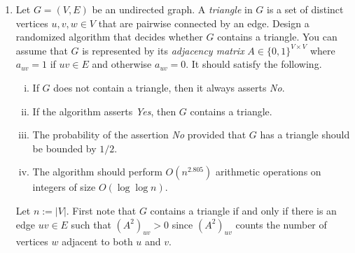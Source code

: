 \documentclass[11pt]{article}
\begin{document}
\begin{enumerate}[1)]
\begin{solution}
\begin{enumerate}[i)]
\item For $k=1$ the claim is trivial. Suppose that the claim holds for some $k>1$. We will show that it holds for $k+1$. One has
\[
(A^{k+1})_{uv}=(A^kA)_{uv}=\sum_{w\in V}(A^k)_{uw}a_{wv}.
\]
By the induction hypothesis, $(A^k)_{uw}$ is the number of directed walks of length $k$ from $u$ to $w$. Multiplying by $a_{wv}$ keeps exactly those walks that can be extended by the arc $w\to v$. Hence the summand counts the directed walks of length $k+1$ from $u$ to $v$ whose penultimate vertex is $w$. Summing over all $w\in V$ counts all directed walks of length $k+1$ from $u$ to $v$. This proves the induction step.

\item Compute $A^k$ by repeated squaring. Writing $k$ in binary representation, one needs $O(\log k)$ matrix multiplications.
Using the algorithm for multiplying two $n\times n$ matrices with arithmetic complexity $O(n^{2.805})$. Thus the total number of arithmetic operations is $O(\log k)\cdot O(n^{2.805})$.

\end{enumerate}
\end{solution}

\item \label{triangle-detection} Let $G = (V,E)$ be an undirected graph. A \emph{triangle} in $G$ is a set of distinct vertices $u,v,w \in V$ that are pairwise connected by an edge.
Design a randomized algorithm that decides whether $G$ contains a triangle. You can assume that $G$ is represented by its \emph{adjacency matrix} $A \in \{0,1\}^{V \times V}$ where  $a_{uv} = 1$ if $uv \in E$ and otherwise $a_{uv} = 0$.  
It should satisfy the following.
\begin{enumerate}[i)] 
\item If $G$ does not contain a triangle, then it always asserts \emph{No}.
\item If the algorithm asserts \emph{Yes}, then $G$ contains a triangle.
\item The probability of the assertion \emph{No} provided that $G$ has a triangle should be bounded by $1/2$.
\item The algorithm should perform $O(n^{2.805})$ arithmetic operations on integers of size $O(\log \log n)$. 
\end{enumerate}

\begin{solution}
Let \(n := |V|\). First note that \(G\) contains a triangle if and only if there is an edge \(uv \in E\) such that $(A^2)_{uv} > 0$ since \((A^2)_{uv}\) counts the number of vertices \(w\) adjacent to both \(u\) and \(v\). 


\end{solution}
\end{enumerate}
\end{document}

